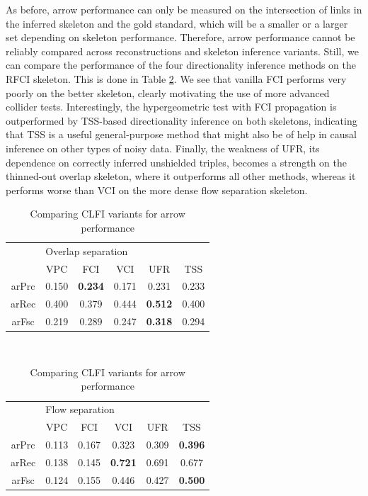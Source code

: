 As before, arrow performance can only be measured on the intersection of links in the inferred skeleton and the gold standard, which will be a smaller or a larger set depending on skeleton performance. Therefore, arrow performance cannot be reliably compared across reconstructions and skeleton inference variants. Still, we can compare the performance of the four directionality inference methods on the RFCI skeleton. This is done in Table \ref{contact-arrow-evaluation-nelex}. We see that vanilla FCI performs very poorly on the better skeleton, clearly motivating the use of more advanced collider tests. Interestingly, the hypergeometric test with FCI propagation is outperformed by TSS-based directionality inference on both skeletons, indicating that TSS is a useful general-purpose method that might also be of help in causal inference on other types of noisy data. Finally, the weakness of UFR, its dependence on correctly inferred unshielded triples, becomes a strength on the thinned-out overlap skeleton, 
where it outperforms all other methods, whereas it performs worse than VCI on the more dense flow separation skeleton.

\begin{table}
 \centering
 \begin{tabular}{cccccc}
 \hline \hline
   & \multicolumn{5}{l}{Overlap separation}\\ 
        &   VPC &   FCI &   VCI &   UFR &   TSS\\ 
 \hline
  arPrc & 0.150 & \textbf{0.234} & 0.171 & 0.231 & 0.233\\
  arRec & 0.400 & 0.379 & 0.444 & \textbf{0.512} & 0.400\\
  arFsc & 0.219 & 0.289 & 0.247 & \textbf{0.318} & 0.294\\
  \hline
 \end{tabular}\\[0.5cm]
  \begin{tabular}{cccccc}
 \hline \hline
   & \multicolumn{5}{l}{Flow separation}\\ 
        &   VPC &   FCI &   VCI &   UFR &   TSS\\ 
 \hline
  arPrc & 0.113 & 0.167 & 0.323 & 0.309 & \textbf{0.396}\\
  arRec & 0.138 & 0.145 & \textbf{0.721} & 0.691 & 0.677\\
  arFsc & 0.124 & 0.155 & 0.446 & 0.427 & \textbf{0.500}\\
  \hline
 \end{tabular}
 \caption{Comparing CLFI variants for arrow performance}
 \label{contact-arrow-evaluation-nelex}
\end{table}

